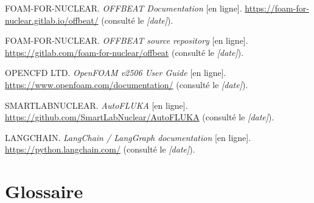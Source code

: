 \documentclass[12pt,a4paper,french]{report}
\begin{document}
\begin{list}{}{\setlength{\leftmargin}{1cm}\setlength{\itemindent}{-1cm}}

\item
FOAM-FOR-NUCLEAR. \textit{OFFBEAT Documentation} [en ligne].
\url{https://foam-for-nuclear.gitlab.io/offbeat/}
(consulté le \textit{[date]}).

\item
FOAM-FOR-NUCLEAR. \textit{OFFBEAT source repository} [en ligne].
\url{https://gitlab.com/foam-for-nuclear/offbeat}
(consulté le \textit{[date]}).

\item
OPENCFD LTD. \textit{OpenFOAM v2506 User Guide} [en ligne].
\url{https://www.openfoam.com/documentation/}
(consulté le \textit{[date]}).

\item
SMARTLABNUCLEAR. \textit{AutoFLUKA} [en ligne].
\url{https://github.com/SmartLabNuclear/AutoFLUKA}
(consulté le \textit{[date]}).

\item
LANGCHAIN. \textit{LangChain / LangGraph documentation} [en ligne].
\url{https://python.langchain.com/}
(consulté le \textit{[date]}).

\end{list}


\clearpage

\chapter*{Glossaire}

\vspace{0.4cm}
\end{document}
